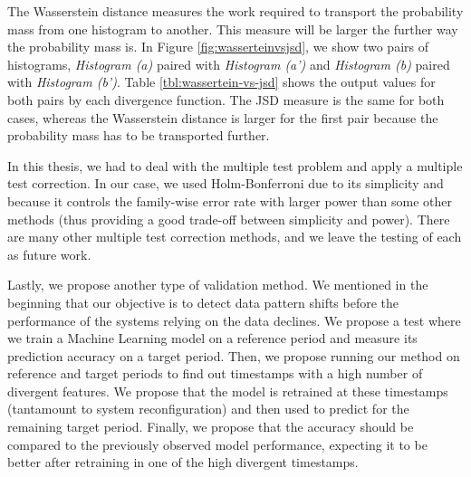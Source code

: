 The Wasserstein distance measures the work required to transport the probability mass from one histogram to another. This measure will be larger the further way the probability mass is. In Figure \ref{fig:wasserteinvsjsd}, we show two pairs of histograms, \textit{Histogram (a)} paired with \textit{Histogram (a')} and \textit{Histogram (b)} paired with \textit{Histogram (b')}. Table \ref{tbl:wassertein-vs-jsd} shows the output values for both pairs by each divergence function. The JSD measure is the same for both cases, whereas the Wasserstein distance is larger for the first pair because the probability mass has to be transported further.

In this thesis, we had to deal with the multiple test problem and apply a multiple test correction. In our case, we used Holm-Bonferroni due to its simplicity and because it controls the family-wise error rate with larger power than some other methods (thus providing a good trade-off between simplicity and power). There are many other multiple test correction methods, and we leave the testing of each as future work.

Lastly, we propose another type of validation method. We mentioned in the beginning that our objective is to detect data pattern shifts before the performance of the systems relying on the data declines. We propose a test where we train a Machine Learning model on a reference period and measure its prediction accuracy on a target period. Then, we propose running our method on reference and target periods to find out timestamps with a high number of divergent features. We propose that the model is retrained at these timestamps (tantamount to system reconfiguration) and then used to predict for the remaining target period. Finally, we propose that the accuracy should be compared to the previously observed model performance, expecting it to be better after retraining in one of the high divergent timestamps.
